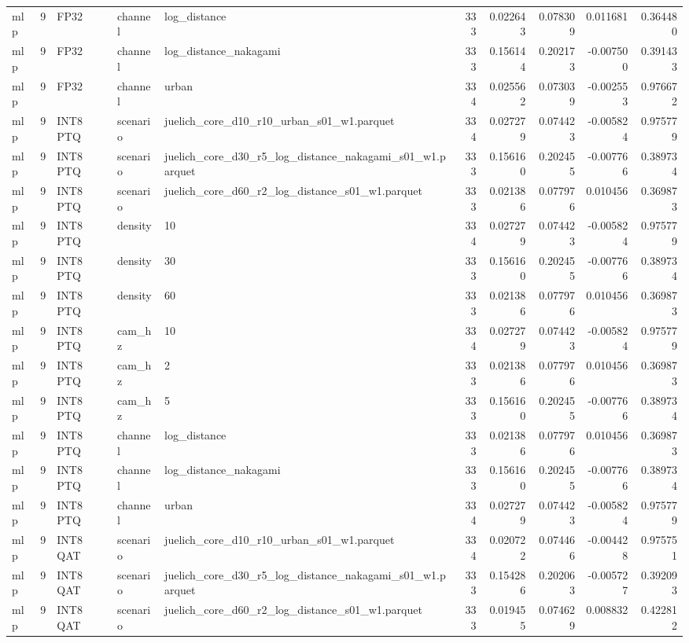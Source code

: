 \begin{tabular}{lrlllrrrrr}
mlp & 9 & FP32 & channel & log\_distance & 333 & 0.022643 & 0.078309 & 0.011681 & 0.364480 \\
mlp & 9 & FP32 & channel & log\_distance\_nakagami & 333 & 0.156144 & 0.202173 & -0.007500 & 0.391433 \\
mlp & 9 & FP32 & channel & urban & 334 & 0.025562 & 0.073039 & -0.002553 & 0.976672 \\
mlp & 9 & INT8 PTQ & scenario & juelich\_core\_d10\_r10\_urban\_s01\_w1.parquet & 334 & 0.027279 & 0.074423 & -0.005824 & 0.975779 \\
mlp & 9 & INT8 PTQ & scenario & juelich\_core\_d30\_r5\_log\_distance\_nakagami\_s01\_w1.parquet & 333 & 0.156160 & 0.202455 & -0.007766 & 0.389734 \\
mlp & 9 & INT8 PTQ & scenario & juelich\_core\_d60\_r2\_log\_distance\_s01\_w1.parquet & 333 & 0.021386 & 0.077976 & 0.010456 & 0.369873 \\
mlp & 9 & INT8 PTQ & density & 10 & 334 & 0.027279 & 0.074423 & -0.005824 & 0.975779 \\
mlp & 9 & INT8 PTQ & density & 30 & 333 & 0.156160 & 0.202455 & -0.007766 & 0.389734 \\
mlp & 9 & INT8 PTQ & density & 60 & 333 & 0.021386 & 0.077976 & 0.010456 & 0.369873 \\
mlp & 9 & INT8 PTQ & cam\_hz & 10 & 334 & 0.027279 & 0.074423 & -0.005824 & 0.975779 \\
mlp & 9 & INT8 PTQ & cam\_hz & 2 & 333 & 0.021386 & 0.077976 & 0.010456 & 0.369873 \\
mlp & 9 & INT8 PTQ & cam\_hz & 5 & 333 & 0.156160 & 0.202455 & -0.007766 & 0.389734 \\
mlp & 9 & INT8 PTQ & channel & log\_distance & 333 & 0.021386 & 0.077976 & 0.010456 & 0.369873 \\
mlp & 9 & INT8 PTQ & channel & log\_distance\_nakagami & 333 & 0.156160 & 0.202455 & -0.007766 & 0.389734 \\
mlp & 9 & INT8 PTQ & channel & urban & 334 & 0.027279 & 0.074423 & -0.005824 & 0.975779 \\
mlp & 9 & INT8 QAT & scenario & juelich\_core\_d10\_r10\_urban\_s01\_w1.parquet & 334 & 0.020722 & 0.074466 & -0.004428 & 0.975751 \\
mlp & 9 & INT8 QAT & scenario & juelich\_core\_d30\_r5\_log\_distance\_nakagami\_s01\_w1.parquet & 333 & 0.154286 & 0.202063 & -0.005727 & 0.392093 \\
mlp & 9 & INT8 QAT & scenario & juelich\_core\_d60\_r2\_log\_distance\_s01\_w1.parquet & 333 & 0.019455 & 0.074629 & 0.008832 & 0.422812 \\

\end{tabular}
